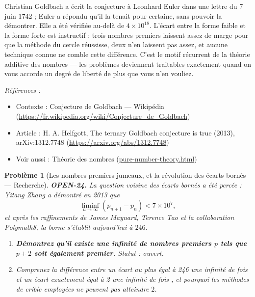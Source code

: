 \documentclass[11pt]{article}
\newtheorem{problem}{Problème}
\newenvironment{refs}{\par\small\noindent\emph{Références :}\begin{itemize}\setlength\itemsep{0pt}}{\end{itemize}\normalsize}
\begin{document}
\noindent Christian Goldbach a écrit la conjecture à Leonhard Euler dans une
lettre du 7 juin 1742 ; Euler a répondu qu'il la tenait pour certaine, sans pouvoir la
démontrer. Elle a été vérifiée au-delà de $ 4 \times 10^{18} $. L'écart entre la forme
faible et la forme forte est instructif : trois nombres premiers laissent assez de marge
pour que la méthode du cercle réussisse, deux n'en laissent pas assez, et aucune technique
connue ne comble cette différence. C'est le motif récurrent de la théorie additive des
nombres --- les problèmes deviennent traitables exactement quand on vous accorde un degré de
liberté de plus que vous n'en vouliez.

\begin{refs}
\item Contexte : Conjecture de Goldbach --- Wikipédia (\url{https://fr.wikipedia.org/wiki/Conjecture_de_Goldbach})
\item Article : H. A. Helfgott, \og{} The ternary Goldbach conjecture is true \fg{} (2013), arXiv:1312.7748 (\url{https://arxiv.org/abs/1312.7748})
\item Voir aussi : Théorie des nombres (\url{pure-number-theory.html})
\end{refs}

\bigskip

\begin{problem}[{Les nombres premiers jumeaux, et la révolution des écarts bornés --- Recherche}]
\textbf{OPEN-24.} La question voisine des écarts \textit{bornés} a été percée : Yitang
Zhang a démontré en 2013 que
\[ \liminf_{n \to \infty}(p_{n+1} - p_n) < 7 \times 10^{7}, \]
et après les raffinements de James Maynard, Terence Tao et la collaboration Polymath8, la
borne s'établit aujourd'hui à $ 246 $.
\begin{enumerate}
\item[(a)] \textbf{Démontrez qu'il existe une infinité de nombres premiers $ p $ tels que
$ p + 2 $ soit également premier.} Statut : ouvert.
\item[(b)] Comprenez la différence entre \og{} un écart au plus égal à 246 une infinité de fois \fg{} et
\og{} un écart exactement égal à 2 une infinité de fois \fg{}, et pourquoi les méthodes de crible
employées ne peuvent pas atteindre $ 2 $.
\end{enumerate}

\end{problem}
\end{document}
